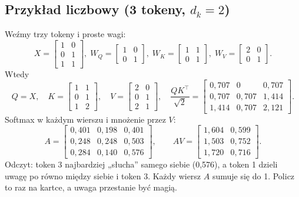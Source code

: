 \documentclass[11pt,a4paper]{article}
\begin{document}
\subsection{Przykład liczbowy (3 tokeny, $d_k=2$)}
Weźmy trzy tokeny i proste wagi:
\[
X=\begin{bmatrix}1&0\\0&1\\1&1\end{bmatrix},\;
W_Q=\begin{bmatrix}1&0\\0&1\end{bmatrix},\;
W_K=\begin{bmatrix}1&1\\0&1\end{bmatrix},\;
W_V=\begin{bmatrix}2&0\\0&1\end{bmatrix}.
\]
Wtedy
\[
Q=X,\quad
K=\begin{bmatrix}1&1\\0&1\\1&2\end{bmatrix},\quad
V=\begin{bmatrix}2&0\\0&1\\2&1\end{bmatrix},\quad
\frac{QK^\top}{\sqrt2}=\begin{bmatrix}0{,}707&0&0{,}707\\0{,}707&0{,}707&1{,}414\\1{,}414&0{,}707&2{,}121\end{bmatrix}.
\]
Softmax w każdym wierszu i mnożenie przez $V$:
\[
A=\begin{bmatrix}0{,}401&0{,}198&0{,}401\\0{,}248&0{,}248&0{,}503\\0{,}284&0{,}140&0{,}576\end{bmatrix},
\qquad
AV=\begin{bmatrix}1{,}604&0{,}599\\1{,}503&0{,}752\\1{,}720&0{,}716\end{bmatrix}.
\]
Odczyt: token 3 najbardziej „słucha'' samego siebie (0,576), a token 1 dzieli uwagę po równo między
siebie i token 3. Każdy wiersz $A$ sumuje się do 1. Policz to raz na kartce, a uwaga przestanie być magią.
\end{document}
